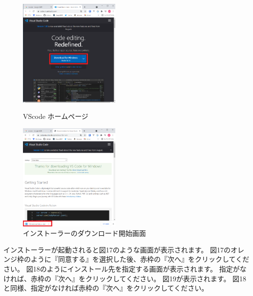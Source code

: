 \documentclass[dvipdfmx]{jsarticle}
\begin{document}
\begin{figure}[H]
    \begin{minipage}[b]{0.495\linewidth}
        \centering
        \includegraphics[width=5cm]{images/VSCodeInstall1.png}
        \caption{VScode ホームページ}
    \end{minipage}
    \begin{minipage}[b]{0.495\linewidth}
        \centering
        \includegraphics[width=5cm]{images/VSCodeInstall2.png}
        \caption{インストーラーのダウンロード開始画面}
    \end{minipage}
\end{figure}

インストーラーが起動されると図17のような画面が表示されます。
図17のオレンジ枠のように『同意する』を選択した後、赤枠の『次へ』をクリックしてください。
図18のようにインストール先を指定する画面が表示されます。
指定がなければ、赤枠の『次へ』をクリックしてください。
図19が表示されます。
図18と同様、指定がなければ赤枠の『次へ』をクリックしてください。
\end{document}
